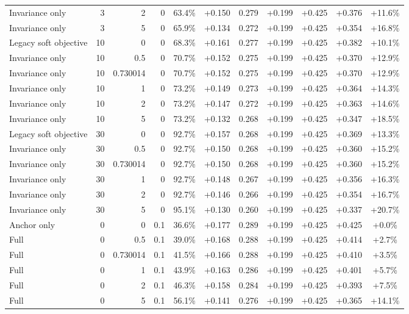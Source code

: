 \begin{table}[htbp]
\begin{tabular}{lrrrccccccc}
Invariance only & 3 & 2 & 0 & 63.4\% & +0.150 & 0.279 & +0.199 & +0.425 & +0.376 & +11.6\% \\
Invariance only & 3 & 5 & 0 & 65.9\% & +0.134 & 0.272 & +0.199 & +0.425 & +0.354 & +16.8\% \\
Legacy soft objective & 10 & 0 & 0 & 68.3\% & +0.161 & 0.277 & +0.199 & +0.425 & +0.382 & +10.1\% \\
Invariance only & 10 & 0.5 & 0 & 70.7\% & +0.152 & 0.275 & +0.199 & +0.425 & +0.370 & +12.9\% \\
Invariance only & 10 & 0.730014 & 0 & 70.7\% & +0.152 & 0.275 & +0.199 & +0.425 & +0.370 & +12.9\% \\
Invariance only & 10 & 1 & 0 & 73.2\% & +0.149 & 0.273 & +0.199 & +0.425 & +0.364 & +14.3\% \\
Invariance only & 10 & 2 & 0 & 73.2\% & +0.147 & 0.272 & +0.199 & +0.425 & +0.363 & +14.6\% \\
Invariance only & 10 & 5 & 0 & 73.2\% & +0.132 & 0.268 & +0.199 & +0.425 & +0.347 & +18.5\% \\
Legacy soft objective & 30 & 0 & 0 & 92.7\% & +0.157 & 0.268 & +0.199 & +0.425 & +0.369 & +13.3\% \\
Invariance only & 30 & 0.5 & 0 & 92.7\% & +0.150 & 0.268 & +0.199 & +0.425 & +0.360 & +15.2\% \\
Invariance only & 30 & 0.730014 & 0 & 92.7\% & +0.150 & 0.268 & +0.199 & +0.425 & +0.360 & +15.2\% \\
Invariance only & 30 & 1 & 0 & 92.7\% & +0.148 & 0.267 & +0.199 & +0.425 & +0.356 & +16.3\% \\
Invariance only & 30 & 2 & 0 & 92.7\% & +0.146 & 0.266 & +0.199 & +0.425 & +0.354 & +16.7\% \\
Invariance only & 30 & 5 & 0 & 95.1\% & +0.130 & 0.260 & +0.199 & +0.425 & +0.337 & +20.7\% \\
Anchor only & 0 & 0 & 0.1 & 36.6\% & +0.177 & 0.289 & +0.199 & +0.425 & +0.425 & +0.0\% \\
Full & 0 & 0.5 & 0.1 & 39.0\% & +0.168 & 0.288 & +0.199 & +0.425 & +0.414 & +2.7\% \\
Full & 0 & 0.730014 & 0.1 & 41.5\% & +0.166 & 0.288 & +0.199 & +0.425 & +0.410 & +3.5\% \\
Full & 0 & 1 & 0.1 & 43.9\% & +0.163 & 0.286 & +0.199 & +0.425 & +0.401 & +5.7\% \\
Full & 0 & 2 & 0.1 & 46.3\% & +0.158 & 0.284 & +0.199 & +0.425 & +0.393 & +7.5\% \\
Full & 0 & 5 & 0.1 & 56.1\% & +0.141 & 0.276 & +0.199 & +0.425 & +0.365 & +14.1\% \\

\end{tabular}
\end{table}
